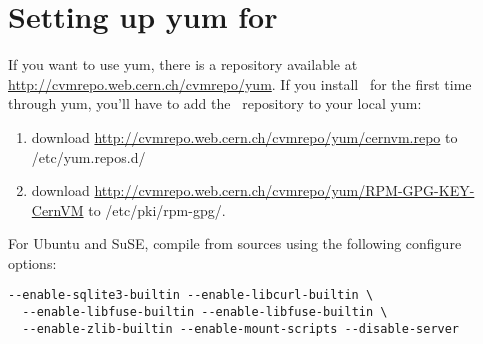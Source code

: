 \section{Setting up yum for \cvmfs}
If you want to use yum, there is a repository available at \url{http://cvmrepo.web.cern.ch/cvmrepo/yum}.
If you install \cvmfs\ for the first time through yum, you'll have to add the \cvmfs\ repository to your local yum:
\begin{enumerate}
	\item download \url{http://cvmrepo.web.cern.ch/cvmrepo/yum/cernvm.repo} to /etc/yum.repos.d/ 
	\item download \url{http://cvmrepo.web.cern.ch/cvmrepo/yum/RPM-GPG-KEY-CernVM} to /etc/pki/rpm-gpg/.
\end{enumerate}
For Ubuntu and SuSE, compile from sources using the following configure options: 
\begin{verbatim}
--enable-sqlite3-builtin --enable-libcurl-builtin \
  --enable-libfuse-builtin --enable-libfuse-builtin \
  --enable-zlib-builtin --enable-mount-scripts --disable-server
\end{verbatim}


